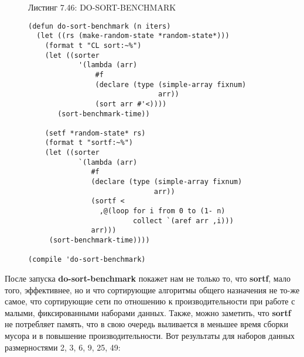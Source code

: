 \begin{figure}Листинг 7.46: DO-SORT-BENCHMARK\label{listing_7.46}
  
\listbegin
\begin{verbatim}
(defun do-sort-benchmark (n iters)
  (let ((rs (make-random-state *random-state*)))
    (format t "CL sort:~%")
    (let ((sorter
            '(lambda (arr)
                #f
                (declare (type (simple-array fixnum)
                               arr))
                (sort arr #'<))))
       (sort-benchmark-time))

    (setf *random-state* rs)
    (format t "sortf:~%")
    (let ((sorter
            `(lambda (arr)
               #f
               (declare (type (simple-array fixnum)
                              arr))
               (sortf <
                 ,@(loop for i from 0 to (1- n)
                         collect `(aref arr ,i)))
               arr)))
     (sort-benchmark-time))))

(compile 'do-sort-benchmark)
\end{verbatim}
\listend
\end{figure}

После запуска \textbf{do-sort-benchmark} покажет нам не только то, что \textbf{sortf}, мало того, эффективнее, но и что сортирующие алгоритмы общего назначения не то-же самое, что сортирующие сети по отношению к производительности при работе с малыми, фиксированными наборами данных. Также, можно заметить, что \textbf{sortf} не потребляет память, что в свою очередь выливается в меньшее время сборки мусора и в повышение производительности. Вот результаты для наборов данных размерностями 2, 3, 6, 9, 25, 49:

